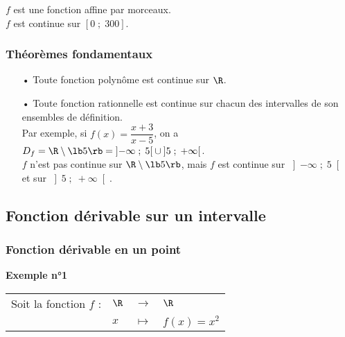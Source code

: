 \vspace*{.3cm}

$f$ est une fonction affine par morceaux. \\

$f$ est continue sur $\left[0 \; ; \; 300\right]$.

\subsubsection{Théorèmes fondamentaux}

\begin{itemize}
\item[•] Toute fonction polynôme est continue sur $\R$. \\
\item[•] Toute fonction rationnelle est continue sur chacun des intervalles de son ensembles de définition. \\

Par exemple, si $f(x) = \dfrac{x+3}{x-5}$, on a $D_f = \R \setminus \lb 5 \rb = \left]-\infty \; ; \; 5\right[ \cup \left]5 \; ; \; +\infty\right[$. \\

$f$ n'est pas continue sur $\R \setminus \lb 5 \rb$, mais $f$ est continue sur $\left]-\infty \; ; \; 5\right[$ et sur $\left]5 \; ; \; +\infty\right[$. 
\end{itemize}

\newpage

\vspace*{-2cm}

\subsection{Fonction dérivable sur un intervalle}

\subsubsection{Fonction dérivable en un point}

\textbf{Exemple n°1} \\

\begin{tabular}{llll}
\hspace{-.3cm} Soit la fonction $f$ : & $\R$ & $\longrightarrow$ & $\R$ \\
& $x$ & $\longmapsto$ & $f\left(x\right) = x^2$ \\
\end{tabular}

